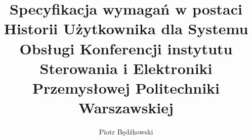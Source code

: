 \documentclass[12pt]{article}
\title{Specyfikacja wymagań w postaci Historii Użytkownika dla Systemu Obsługi Konferencji instytutu Sterowania i Elektroniki Przemysłowej Politechniki Warszawskiej }
\author{Piotr Będźkowski}
\begin{document}
    \renewcommand{\figurename}{Rys.}    %
    \renewcommand{\tablename}{Tab.}     %
    \thispagestyle{empty}               %
    \stronatytulowa                     %

    
    
    

    \renewcommand{\cftbeforesecskip}{8pt}
    \renewcommand{\cftsecafterpnum}{\vskip 8pt}
    \renewcommand{\cftparskip}{3pt}
    \renewcommand{\cfttoctitlefont}{\Large\bfseries\sffamily}
    \renewcommand{\cftsecfont}{\bfseries\sffamily}
    \renewcommand{\cftsubsecfont}{\sffamily}
    \renewcommand{\cftsubsubsecfont}{\sffamily}
    \renewcommand{\cftparafont}{\sffamily}

    \tableofcontents    %


    \hypersetup{linkcolor=black}
    \renewcommand{\cftparskip}{3pt}
    \renewcommand{\cftloftitlefont}{\Large\bfseries\sffamily}
\end{document}
